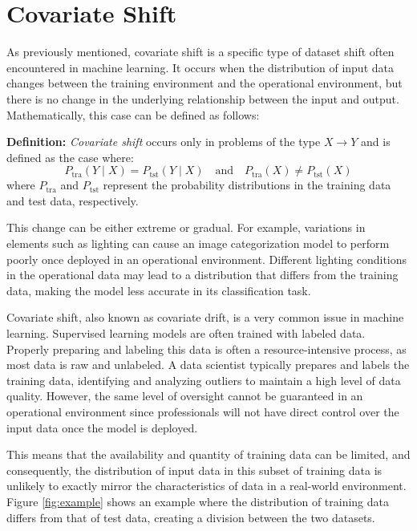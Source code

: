 \section{Covariate Shift}

As previously mentioned, covariate shift is a specific type of dataset shift often encountered in machine learning. It occurs when the distribution of input data changes between the training environment and the operational environment, but there is no change in the underlying relationship between the input and output.  
Mathematically, this case can be defined as follows:  
\vspace{0.5cm}  

\textbf{Definition:} \textit{Covariate shift} occurs only in problems of the type \(X \to Y\) and is defined as the case where:  
\[
P_{\text{tra}}(Y \mid X) = P_{\text{tst}}(Y \mid X) \quad \text{and} \quad P_{\text{tra}}(X) \neq P_{\text{tst}}(X)
\]
where \(P_{\text{tra}}\) and \(P_{\text{tst}}\) represent the probability distributions in the training data and test data, respectively.  
\vspace{0.5cm}  

This change can be either extreme or gradual. For example, variations in elements such as lighting can cause an image categorization model to perform poorly once deployed in an operational environment. Different lighting conditions in the operational data may lead to a distribution that differs from the training data, making the model less accurate in its classification task.  

Covariate shift, also known as covariate drift, is a very common issue in machine learning. Supervised learning models are often trained with labeled data. Properly preparing and labeling this data is often a resource-intensive process, as most data is raw and unlabeled. A data scientist typically prepares and labels the training data, identifying and analyzing outliers to maintain a high level of data quality. However, the same level of oversight cannot be guaranteed in an operational environment since professionals will not have direct control over the input data once the model is deployed.  

This means that the availability and quantity of training data can be limited, and consequently, the distribution of input data in this subset of training data is unlikely to exactly mirror the characteristics of data in a real-world environment. Figure \ref{fig:example} shows an example where the distribution of training data differs from that of test data, creating a division between the two datasets.  

